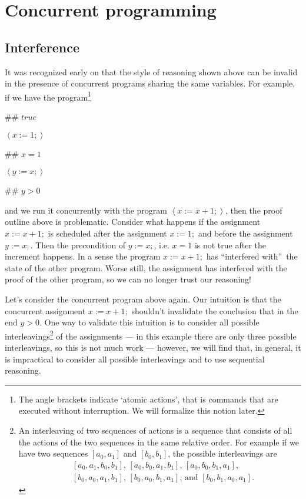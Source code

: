 \documentclass[11pt]{article}%
\begin{document}
\section{Concurrent programming\label{conc}}

\subsection{Interference}

It was recognized early on that the style of reasoning shown above can be
invalid in the presence of concurrent programs sharing the same variables. For
example, if we have the program\footnote{The angle brackets indicate `atomic
actions', that is commands that are executed without interruption. We will
formalize this notion later.}

\begin{code}
\#\# $\mathit{true}$

$\left\langle x:=1;\right\rangle $

\#\# $x=1$

$\left\langle y:=x;\right\rangle $

\#\# $y>0$
\end{code}

\noindent and we run it concurrently with the program $\left\langle
x:=x+1;\right\rangle $, then the proof outline above is problematic. Consider
what happens if the assignment $x:=x+1;$ is scheduled after the assignment
$x:=1;$ and before the assignment $y:=x;$. Then the precondition of $y:=x;$,
i.e. $x=1$ is not true after the increment happens. In a sense the program
$x:=x+1;$ has \textquotedblleft interfered with\textquotedblright\ the state
of the other program. Worse still, the assignment has interfered with the
proof of the other program, so we can no longer trust our reasoning!

Let's consider the concurrent program above again. Our intuition is that the
concurrent assignment $x:=x+1;$ shouldn't invalidate the conclusion that in
the end $y>0$. One way to validate this intuition is to consider all possible
interleavings\footnote{An interleaving of two sequences of actions is a
sequence that consists of all the actions of the two sequences in the same
relative order. For example if we have two sequences $\left[  a_{0}%
,a_{1}\right]  $ and $\left[  b_{0},b_{1}\right]  $, the possible
interleavings are
\begin{align*}
&  \left[  a_{0},a_{1},b_{0},b_{1}\right]  \text{, }\left[  a_{0},b_{0}%
,a_{1},b_{1}\right]  \text{, }\left[  a_{0},b_{0},b_{1},a_{1}\right]  \text{,
}\\
&  \left[  b_{0},a_{0},a_{1},b_{1}\right]  \text{, }\left[  b_{0},a_{0}%
,b_{1},a_{1}\right]  \text{, and }\left[  b_{0},b_{1},a_{0},a_{1}\right]  .
\end{align*}
} of the assignments --- in this example there are only three possible
interleavings, so this is not much work --- however, we will find that, in
general, it is impractical to consider all possible interleavings and to use
sequential reasoning.
\end{document}
